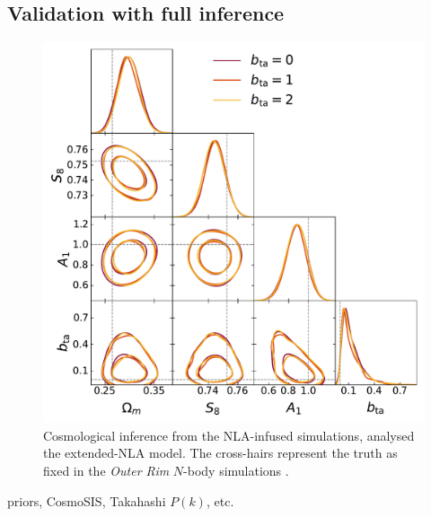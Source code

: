 \subsection{Validation with full inference}
 \label{sec:inference}
\begin{figure}
\includegraphics[width=\columnwidth]{graphs/triangle_bta_sweep.pdf}
\caption{Cosmological inference from the NLA-infused simulations, analysed the extended-NLA model. 
The cross-hairs represent the truth as fixed in the {\it Outer Rim} $N$-body simulations \citep{OuterRim}. }
\label{fig:triangle_nla}
\end{figure}
priors, {\sc CosmoSIS}, Takahashi $P(k)$, etc.





